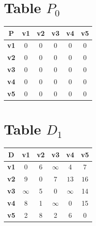 \documentclass{article}
\begin{document}
\section{Table $P_{0}$}
\begin{center}
    \begin{tabular}{|c||c|c|c|c|c|}
        \hline
        \textbf{P} & \textbf{v1} & \textbf{v2} & \textbf{v3} & \textbf{v4} & \textbf{v5} \\
        \hline
        \hline
        \textbf{v1}& 0 & 0 & 0 & 0 & 0 \\
        \hline
        \textbf{v2}& 0 & 0 & 0 & 0 & 0 \\
        \hline
        \textbf{v3}& 0 & 0 & 0 & 0 & 0 \\
        \hline
        \textbf{v4}& 0 & 0 & 0 & 0 & 0 \\
        \hline
        \textbf{v5}& 0 & 0 & 0 & 0 & 0 \\
        \hline
    \end{tabular}
\end{center}


\section{Table $D_{1}$}
\begin{center}
    \begin{tabular}{|c||c|c|c|c|c|}
        \hline
        \textbf{D} & \textbf{v1} & \textbf{v2} & \textbf{v3} & \textbf{v4} & \textbf{v5} \\
        \hline
        \hline
        \textbf{v1}& 0 & 6 & $\infty$ & 4 & 7 \\
        \hline
        \textbf{v2}& 9 & 0 & 7 & \cellcolor[HTML]{D74894}$13$ & \cellcolor[HTML]{D74894}$16$ \\
        \hline
        \textbf{v3}& $\infty$ & 5 & 0 & $\infty$ & 14 \\
        \hline
        \textbf{v4}& 8 & 1 & $\infty$ & 0 & 15 \\
        \hline
        \textbf{v5}& 2 & \cellcolor[HTML]{D74894}$8$ & 2 & \cellcolor[HTML]{D74894}$6$ & 0 \\
        \hline
    \end{tabular}
\end{center}
\end{document}
